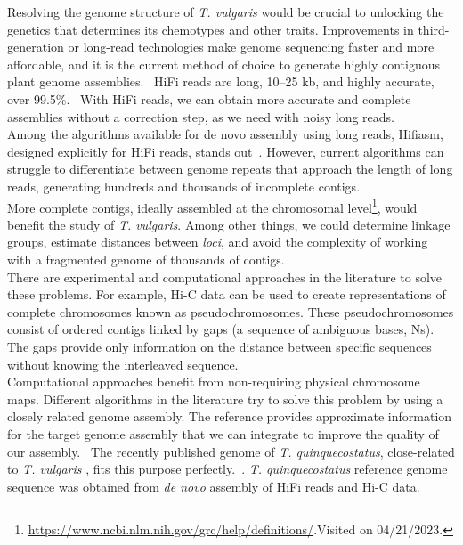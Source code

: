 Resolving the genome structure of \textit{T. vulgaris} would be crucial to unlocking the genetics that determines its chemotypes and other traits.  Improvements in third-generation or long-read technologies make genome sequencing faster and more affordable, and it is the current method of choice to generate highly contiguous plant genome assemblies.~\cite{puckerPlantGenomeSequence2022} \ac{HiFi} reads are long, 10–25 kb, and highly accurate, over 99.5\%.~\cite{honHighlyAccurateLongread2020} With \ac{HiFi} reads, we can obtain more accurate and complete assemblies without a correction step, as we need with noisy long reads.~\cite{puckerPlantGenomeSequence2022}\\

Among the algorithms available for de novo assembly using long reads, Hifiasm, designed explicitly for \ac{HiFi} reads, stands out~\cite{chengHaplotyperesolvedNovoAssembly2021}. However, current algorithms can struggle to differentiate between genome repeats that approach the length of long reads, generating hundreds and thousands of incomplete contigs.~\cite{huangAlignGraph2SimilarGenomeassisted2021} \\

More complete contigs, ideally assembled at the chromosomal level\footnote{\url{https://www.ncbi.nlm.nih.gov/grc/help/definitions/}.Visited on 04/21/2023.}, would benefit the study of \textit{T. vulgaris}. Among other things, we could determine linkage groups, estimate distances between \textit{loci}, and avoid the complexity of working with a fragmented genome of thousands of contigs.~\cite{tamazianChromosomerReferencebasedGenome2016}\\

There are experimental and computational approaches in the literature to solve these problems. For example, \ac{Hi-C} data can be used to create representations of complete chromosomes known as pseudochromosomes. These pseudochromosomes consist of ordered contigs linked by gaps (a sequence of ambiguous bases, Ns). The gaps provide only information on the distance between specific sequences without knowing the interleaved sequence.~\cite{puckerPlantGenomeSequence2022}\\

Computational approaches benefit from non-requiring physical chromosome maps. Different algorithms in the literature try to solve this problem by using a closely related genome assembly. The reference provides approximate information for the target genome assembly that we can integrate to improve the quality of our assembly.~\cite{huangAlignGraph2SimilarGenomeassisted2021}  The recently published genome of \textit{T. quinquecostatus}, close-related to \textit{T. vulgaris} \cite{sunPopulationDiversityAnalyses2023},  fits this purpose perfectly.~\cite{sunChromosomelevelAssemblyAnalysis2022}. \textit{T. quinquecostatus} reference genome sequence was obtained from \textit{de novo} assembly of  \ac{HiFi} reads and \ac{Hi-C} data.\\ 

